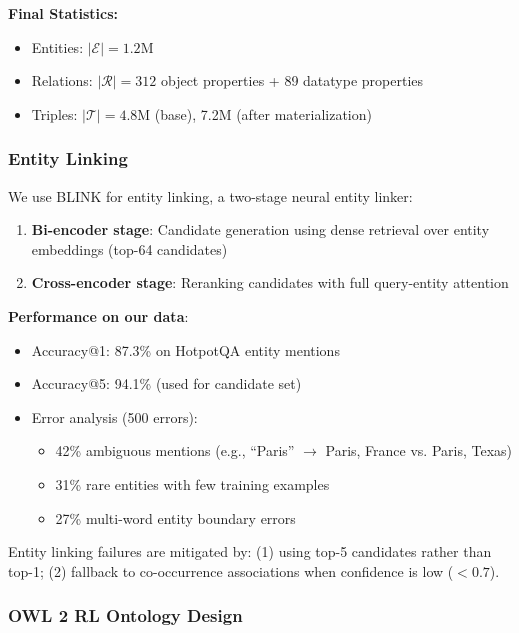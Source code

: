 \documentclass[10pt,twocolumn]{article}
\begin{document}
\textbf{Final Statistics:}
\begin{itemize}
    \item Entities: $|\mathcal{E}| = 1.2$M
    \item Relations: $|\mathcal{R}| = 312$ object properties + 89 datatype properties
    \item Triples: $|\mathcal{T}| = 4.8$M (base), 7.2M (after materialization)
\end{itemize}

\subsubsection{Entity Linking}
\label{sec:entity_linking}

We use BLINK \cite{wu2020blink} for entity linking, a two-stage neural entity linker:

\begin{enumerate}
    \item \textbf{Bi-encoder stage}: Candidate generation using dense retrieval over entity embeddings (top-64 candidates)
    \item \textbf{Cross-encoder stage}: Reranking candidates with full query-entity attention
\end{enumerate}

\textbf{Performance on our data}:
\begin{itemize}
    \item Accuracy@1: 87.3\% on HotpotQA entity mentions
    \item Accuracy@5: 94.1\% (used for candidate set)
    \item Error analysis (500 errors):
    \begin{itemize}
        \item 42\% ambiguous mentions (e.g., ``Paris'' $\rightarrow$ Paris, France vs. Paris, Texas)
        \item 31\% rare entities with few training examples
        \item 27\% multi-word entity boundary errors
    \end{itemize}
\end{itemize}

Entity linking failures are mitigated by: (1) using top-5 candidates rather than top-1; (2) fallback to co-occurrence associations when confidence is low ($<0.7$).

\subsubsection{OWL 2 RL Ontology Design}
\label{sec:owl2rl}
\end{document}
